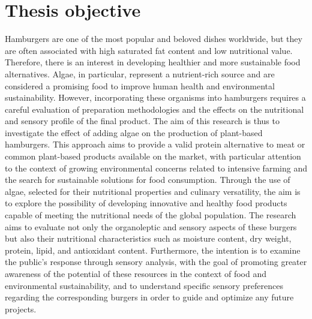 \section{Thesis objective}
Hamburgers are one of the most popular and beloved dishes worldwide, but they are often associated with high saturated fat content and low nutritional value. Therefore, there is an interest in developing healthier and more sustainable food alternatives. Algae, in particular, represent a nutrient-rich source and are considered a promising food to improve human health and environmental sustainability. However, incorporating these organisms into hamburgers requires a careful evaluation of preparation methodologies and the effects on the nutritional and sensory profile of the final product. The aim of this research is thus to investigate the effect of adding algae on the production of plant-based hamburgers. This approach aims to provide a valid protein alternative to meat or common plant-based products available on the market, with particular attention to the context of growing environmental concerns related to intensive farming and the search for sustainable solutions for food consumption. Through the use of algae, selected for their nutritional properties and culinary versatility, the aim is to explore the possibility of developing innovative and healthy food products capable of meeting the nutritional needs of the global population. The research aims to evaluate not only the organoleptic and sensory aspects of these burgers but also their nutritional characteristics such as moisture content, dry weight, protein, lipid, and antioxidant content. Furthermore, the intention is to examine the public's response through sensory analysis, with the goal of promoting greater awareness of the potential of these resources in the context of food and environmental sustainability, and to understand specific sensory preferences regarding the corresponding burgers in order to guide and optimize any future projects.
